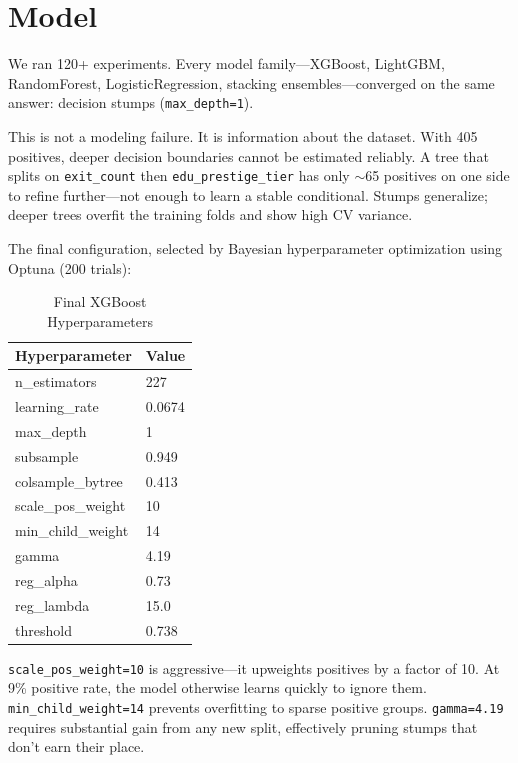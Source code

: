 \documentclass[10pt, conference]{IEEEtran}
\begin{document}
\section{Model}

We ran 120+ experiments. Every model family---XGBoost, LightGBM, RandomForest, LogisticRegression, stacking ensembles---converged on the same answer: decision stumps (\texttt{max\_depth=1}).

This is not a modeling failure. It is information about the dataset. With 405 positives, deeper decision boundaries cannot be estimated reliably. A tree that splits on \texttt{exit\_count} then \texttt{edu\_prestige\_tier} has only $\sim$65 positives on one side to refine further---not enough to learn a stable conditional. Stumps generalize; deeper trees overfit the training folds and show high CV variance.

The final configuration, selected by Bayesian hyperparameter optimization using Optuna (200 trials):

\begin{table}[h]
\centering
\caption{Final XGBoost Hyperparameters}
\begin{tabular}{@{}ll@{}}
\toprule
\textbf{Hyperparameter} & \textbf{Value} \\
\midrule
n\_estimators      & 227    \\
learning\_rate     & 0.0674 \\
max\_depth         & 1      \\
subsample          & 0.949  \\
colsample\_bytree  & 0.413  \\
scale\_pos\_weight & 10     \\
min\_child\_weight & 14     \\
gamma              & 4.19   \\
reg\_alpha         & 0.73   \\
reg\_lambda        & 15.0   \\
threshold          & 0.738  \\
\bottomrule
\end{tabular}
\end{table}

\texttt{scale\_pos\_weight=10} is aggressive---it upweights positives by a factor of 10. At 9\% positive rate, the model otherwise learns quickly to ignore them. \texttt{min\_child\_weight=14} prevents overfitting to sparse positive groups. \texttt{gamma=4.19} requires substantial gain from any new split, effectively pruning stumps that don't earn their place.
\end{document}
